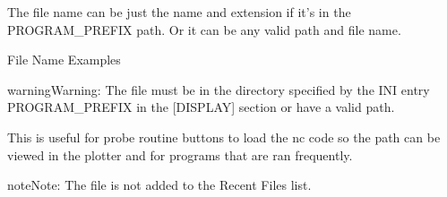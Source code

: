\documentclass[letterpaper,10pt,english]{sphinxmanual}
\begin{document}

\sphinxAtStartPar
The file name can be just the name and extension if it’s in the PROGRAM\_PREFIX
path. Or it can be any valid path and file name.

\sphinxAtStartPar
File Name Examples

\begin{sphinxVerbatim}[commandchars=\\\{\}]
     

     

        

       
 
\end{sphinxVerbatim}

\begin{sphinxadmonition}{warning}{Warning:}
\sphinxAtStartPar
The file must be in the directory specified by the INI entry
PROGRAM\_PREFIX in the {[}DISPLAY{]} section or have a valid path.
\end{sphinxadmonition}

\sphinxAtStartPar
This is useful for probe routine buttons to load the nc code so the
path can be viewed in the plotter and for programs that are ran frequently.

\begin{sphinxadmonition}{note}{Note:}
\sphinxAtStartPar
The file is not added to the Recent Files list.
\end{sphinxadmonition}

\sphinxstepscope
\end{document}
